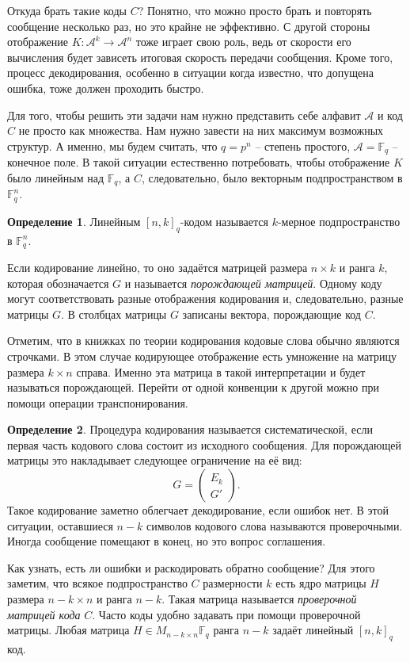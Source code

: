 \documentclass[12pt,a4paper,oneside]{book}
\theoremstyle{definition}
\newtheorem*{defn}{\color{yellow!30!red} Определение}
\newcommand{\mc}[1]{\mathcal{#1}}
\newcommand{\F}{\mathbb F}
\def\dfn{\begin{defn}}
\def\edfn{\end{defn}}
\def\pmat{\begin{pmatrix}}
\def\epmat{\end{pmatrix}}
\begin{document}
Откуда брать такие коды $C$? Понятно, что можно просто брать и повторять сообщение несколько раз, но это крайне не эффективно. С другой стороны отображение $K \colon \mc A^k \to \mc A^n$ тоже играет свою роль, ведь от скорости его вычисления будет зависеть итоговая скорость передачи сообщения. Кроме того, процесс декодирования, особенно в ситуации когда известно, что допущена ошибка, тоже должен проходить быстро.

Для того, чтобы решить эти задачи нам нужно представить себе алфавит $\mc A$ и код $C$ не просто как множества. Нам нужно завести на них максимум возможных структур. А именно, мы будем считать, что  $q=p^n$ -- степень простого, $\mc A = \F_q$ -- конечное поле. В такой ситуации естественно потребовать, чтобы отображение $K$ было линейным над $\F_q$, а $C$, следовательно, было векторным подпространством в $\F_q^n$.

\dfn Линейным $[n,k]_q$-кодом называется $k$-мерное подпространство в $\F_q^n$.
\edfn

Если кодирование линейно, то оно задаётся матрицей размера $n\times k$ и ранга $k$, которая обозначается $G$ и называется {\it порождающей матрицей}. Одному коду могут соответствовать разные отображения кодирования и, следовательно, разные матрицы $G$. В столбцах матрицы $G$ записаны вектора, порождающие код $C$. 

Отметим, что в книжках по теории кодирования кодовые слова обычно являются строчками. В этом случае кодирующее отображение есть умножение на матрицу размера $k\times n$ справа. Именно эта матрица в такой интерпретации и будет называться порождающей. Перейти от одной конвенции к другой можно при помощи операции транспонирования.

\dfn Процедура кодирования называется систематической, если первая часть кодового слова состоит из исходного сообщения. Для порождающей матрицы это накладывает следующее ограничение на её вид: 
$$G= \pmat E_k\\ G' \epmat.$$
Такое кодирование заметно облегчает декодирование, если ошибок нет. В этой ситуации, оставшиеся $n-k$ символов кодового слова называются проверочными. Иногда сообщение помещают в конец, но это вопрос соглашения.
\edfn

Как узнать, есть ли ошибки и раскодировать обратно сообщение? Для этого заметим, что всякое подпространство $C$ размерности $k$ есть ядро матрицы $H$ размера $n-k\times n$ и ранга $n-k$. Такая матрица называется {\it проверочной матрицей кода} $C$. Часто коды удобно задавать при помощи проверочной матрицы. Любая матрица $H\in M_{n-k\times n}{\F_q}$ ранга $n-k$ задаёт линейный $[n,k]_q$ код. 
\end{document}
